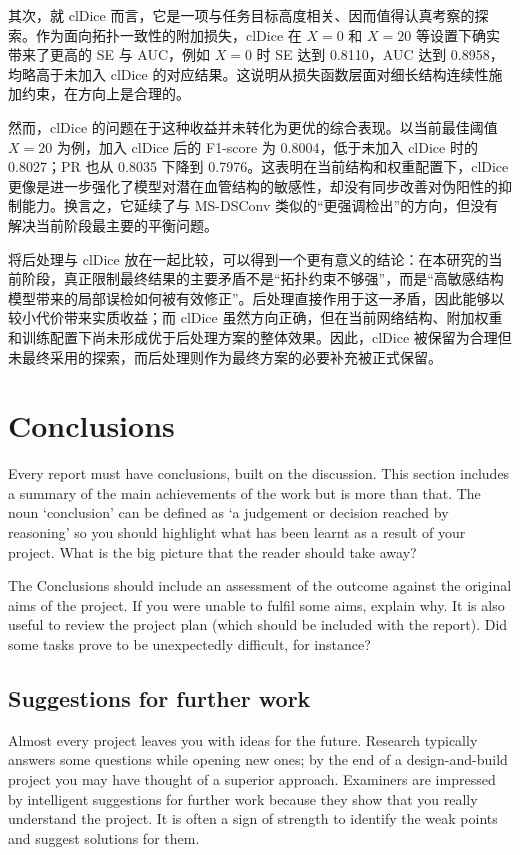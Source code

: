 \documentclass[a4paper,12pt]{article}
\begin{document}
其次，就 clDice 而言，它是一项与任务目标高度相关、因而值得认真考察的探索。作为面向拓扑一致性的附加损失，clDice 在 \(X=0\) 和 \(X=20\) 等设置下确实带来了更高的 SE 与 AUC，例如 \(X=0\) 时 SE 达到 0.8110，AUC 达到 0.8958，均略高于未加入 clDice 的对应结果。这说明从损失函数层面对细长结构连续性施加约束，在方向上是合理的。

然而，clDice 的问题在于这种收益并未转化为更优的综合表现。以当前最佳阈值 \(X=20\) 为例，加入 clDice 后的 F1-score 为 0.8004，低于未加入 clDice 时的 0.8027；PR 也从 0.8035 下降到 0.7976。这表明在当前结构和权重配置下，clDice 更像是进一步强化了模型对潜在血管结构的敏感性，却没有同步改善对伪阳性的抑制能力。换言之，它延续了与 MS-DSConv 类似的“更强调检出”的方向，但没有解决当前阶段最主要的平衡问题。

将后处理与 clDice 放在一起比较，可以得到一个更有意义的结论：在本研究的当前阶段，真正限制最终结果的主要矛盾不是“拓扑约束不够强”，而是“高敏感结构模型带来的局部误检如何被有效修正”。后处理直接作用于这一矛盾，因此能够以较小代价带来实质收益；而 clDice 虽然方向正确，但在当前网络结构、附加权重和训练配置下尚未形成优于后处理方案的整体效果。因此，clDice 被保留为合理但未最终采用的探索，而后处理则作为最终方案的必要补充被正式保留。


\section{Conclusions}

Every report must have conclusions, built on the discussion. This section includes a summary of the main achievements of the work but is more than that. The noun `conclusion' can be defined as `a judgement or decision reached by reasoning' \cite{oupconc} so you should highlight what has been learnt as a result of your project. What is the big picture that the reader should take away? 

The Conclusions should include an assessment of the outcome against the original aims of the project. If you were unable to fulfil some aims, explain why. It is also useful to review the project plan (which should be included with the report). Did some tasks prove to be unexpectedly difficult, for instance?

\subsection{Suggestions for further work}

Almost every project leaves you with ideas for the future. Research typically answers some questions while opening new ones; by the end of a design-and-build project you may have thought of a superior approach. Examiners are impressed by intelligent suggestions for further work because they show that you really understand the project. It is often a sign of strength to identify the weak points and suggest solutions for them.
\end{document}

